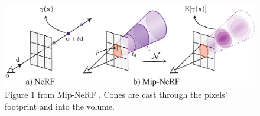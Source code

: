 \begin{figure}[h]
    \centering
    \includegraphics[width=1.0\textwidth]{figures/MipNeRFFrustums.png}
    \caption{Figure 1 from Mip-NeRF \cite{barron_mip-nerf_2021}. Cones are cast through the pixels' footprint and into the volume.}
    \label{fig:mip-nerf-frustums}
\end{figure}